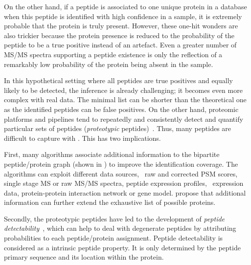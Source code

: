 On the other hand,
if a peptide is associated to one unique protein in a database
when this peptide is identified with high confidence in a sample,
it is extremely probable that the protein is truly present.
However, these one-hit wonders are also trickier because
the protein presence is reduced to
the probability of the peptide to be a true positive instead of an artefact.
Even a greater number of \gls{MS/MS} spectra supporting a peptide existence
is only the reflection of a remarkably low probability of the protein being absent
in the sample.\mybr\

In this hypothetical setting
where all peptides are true positives and equally likely to be detected,
the inference is already challenging;
it becomes even more complex with real data.
The minimal list can be shorter than the theoretical one as
the identified peptides can be false positives.
On the other hand,
proteomic platforms and pipelines tend to
repeatedly and consistently detect and quantify particular sets of peptides
(\emph{proteotypic} peptides)~.
Thus, many peptides are difficult to capture with \ms.
This has two implications.\mybr\

First, many algorithms associate additional information
to the bipartite peptide/protein graph (shown in )
to improve the identification coverage.
The algorithms can exploit different data sources, \eg\ raw and corrected \gls{PSM} scores,
single stage \gls{MS} or raw \gls{MS/MS} spectra,
peptide expression profiles, \mRNA\ expression data,
protein-protein interaction network or gene model.
\citet{Huang2012-nr} propose that additional information can further
extend the exhaustive list of possible proteins.\mybr\

Secondly, the proteotypic peptides have led to
the development of \emph{peptide detectability}~,
which can help to deal with degenerate peptides
by attributing probabilities to each peptide/protein assignment.
Peptide detectability is considered as a intrinsic peptide property.
It is only determined by the peptide primary sequence and
its location within the protein.\mybr\

